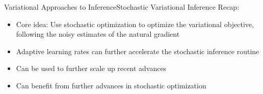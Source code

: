 \documentclass[AERbeamer%
              ,optEnglish%
              ,optBiber%
              ,optBibstyleAlphabetic%
              ,optBeamerClassicFormat%
              ]{AERlatex}%
\begin{document}
\begin{frame}[c]{Variational Approaches to Inference}{Stochastic Variational Inference}
    Recap:
    \begin{itemize}
        \item Core idea: Use stochastic optimization to optimize the variational objective, following the noisy
              estimates of the natural gradient
        \item Adaptive learning rates can further accelerate the stochastic inference routine
        \item Can be used to further scale up recent advances
        \item Can benefit from further advances in stochastic optimization
    \end{itemize}
\end{frame}
\end{document}
